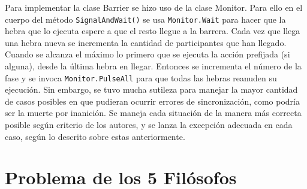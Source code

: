 \documentclass[12pt]{amsart}
\theoremstyle{definition}
\numberwithin{equation}{section}
\newcommand{\csl}[1]{\texttt{#1}}
\begin{document}
Para implementar la clase Barrier se hizo uso de la clase Monitor. Para ello en el cuerpo del m\'etodo \csl{SignalAndWait()} se usa \csl{Monitor.Wait} para hacer que la hebra que lo ejecuta espere a que el resto llegue a la barrera. Cada vez que llega una hebra nueva se incrementa la cantidad de participantes que han llegado. Cuando se alcanza el m\'aximo lo primero que se ejecuta la acci\'on prefijada (si alguna), desde la \'ultima hebra en llegar. Entonces se incrementa el n\'umero de la fase y se invoca \csl{Monitor.PulseAll} para que todas las hebras reanuden su ejecuci\'on. Sin embargo, se tuvo mucha sutileza para manejar la mayor cantidad de casos posibles en que pudieran ocurrir errores de sincronizaci\'on, como podr\'ia ser la muerte por inanici\'on. Se maneja cada situaci\'on de la manera m\'as correcta posible seg\'un criterio de los autores, y se lanza la excepci\'on adecuada en cada caso, seg\'un lo descrito sobre estas anteriormente.

\section{Problema de los 5 Fil\'osofos}
\end{document}
